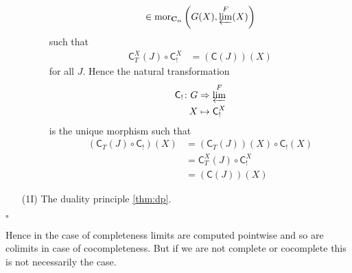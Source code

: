 \begin{prf}
\begin{enumerate}
\begin{description}
\begin{align*}
  \in
  \mathrm{mor}_{\mathbf{C}_{\alpha}}
  \left(
    G(X),
    \varprojlim^{F}(X)
  \right)
\end{align*}
such that
\begin{align*}
  \mathsf{C}_{T}^{X}(J)
  \circ
  \mathsf{C}_{!}^{X}
  &=
  (\mathsf{C}(J))(X)
\end{align*}
for all $J$. Hence the natural transformation
\begin{align*}
  \mathsf{C}_{!}
  \colon
  G
  &\Rightarrow
  \varprojlim^{F}
  \\
  X
  &\mapsto
  \mathsf{C}_{!}^{X}
\end{align*}
is the unique morphism such that
\begin{align*}
  \left(
    \mathsf{C}_{T}(J)
    \circ
    \mathsf{C}_{!}
  \right)
  (X)
  &=
  \left(
    \mathsf{C}_{T}(J)
  \right)
  (X)
  \circ
  \mathsf{C}_{!}(X)
  \\
  &=
  \mathsf{C}_{T}^{X}(J)
  \circ
  \mathsf{C}_{!}^{X}
  \\
  &=
  (\mathsf{C}(J))(X)
\end{align*}
\end{description}
\item[(1I)]
The duality principle \ref{thm:dp}.
\end{enumerate}
\phantom{proven}
\hfill
$\square$
\end{prf}
Hence in the case of completeness limits are computed {\glqq}pointwise{\grqq} and so are colimits in case of cocompleteness. But if we are not complete or cocomplete this is not necessarily the case. 

